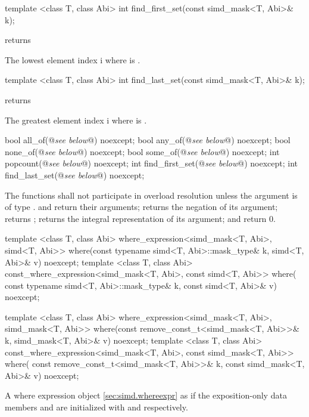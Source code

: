 \begin{itemdecl}
template <class T, class Abi> int find_first_set(const simd_mask<T, Abi>& k);
\end{itemdecl}
\begin{itemdescr}
  \pnum\requires {} returns \true

  \pnum\returns The lowest element index \code i where  is \true.
\end{itemdescr}

\begin{itemdecl}
template <class T, class Abi> int find_last_set(const simd_mask<T, Abi>& k);
\end{itemdecl}
\begin{itemdescr}
  \pnum\requires {} returns \true

  \pnum\returns The greatest element index \code i where  is \true.
\end{itemdescr}

\begin{itemdecl}
bool  all_of(@\emph{see below}@) noexcept;
bool  any_of(@\emph{see below}@) noexcept;
bool none_of(@\emph{see below}@) noexcept;
bool some_of(@\emph{see below}@) noexcept;
int popcount(@\emph{see below}@) noexcept;
int find_first_set(@\emph{see below}@) noexcept;
int find_last_set(@\emph{see below}@) noexcept;
\end{itemdecl}
\begin{itemdescr}
  \pnum\remarks The functions shall not participate in overload resolution unless the argument is of type \bool.
  \pnum\returns {} and  return their arguments;  returns the negation of its argument;  returns \false;  returns the integral representation of its argument;  and  return 0.
\end{itemdescr}

\begin{itemdecl}
template <class T, class Abi>
where_expression<simd_mask<T, Abi>, simd<T, Abi>> where(const typename simd<T, Abi>::mask_type& k,
                                                        simd<T, Abi>& v) noexcept;
template <class T, class Abi>
const_where_expression<simd_mask<T, Abi>, const simd<T, Abi>> where(
    const typename simd<T, Abi>::mask_type& k, const simd<T, Abi>& v) noexcept;

template <class T, class Abi>
where_expression<simd_mask<T, Abi>, simd_mask<T, Abi>> where(const remove_const_t<simd_mask<T, Abi>>& k,
                                                             simd_mask<T, Abi>& v) noexcept;
template <class T, class Abi>
const_where_expression<simd_mask<T, Abi>, const simd_mask<T, Abi>> where(
    const remove_const_t<simd_mask<T, Abi>>& k, const simd_mask<T, Abi>& v) noexcept;
\end{itemdecl}
\begin{itemdescr}
  \pnum\returns A where expression object \ref{sec:simd.whereexpr} as if the exposition-only data members  and  are initialized with  and  respectively.
\end{itemdescr}

